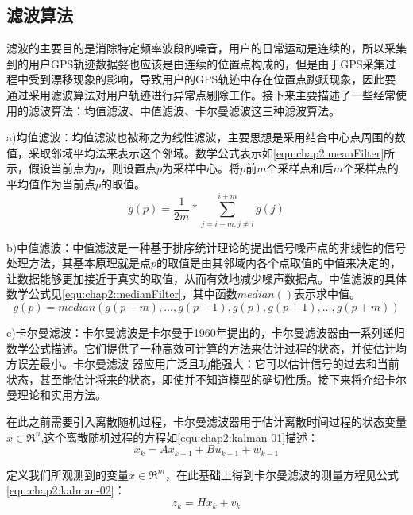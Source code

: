 \subsection{滤波算法}
\label{sec:section2-1-1}
滤波的主要目的是消除特定频率波段的噪音，用户的日常运动是连续的，所以采集到的用户GPS轨迹数据㛑也应该是由连续的位置点构成的，但是由于GPS采集过程中受到漂移现象的影响，导致用户的GPS轨迹中存在位置点跳跃现象，因此要通过采用滤波算法对用户轨迹进行异常点剔除工作。接下来主要描述了一些经常使用的滤波算法：均值滤波、中值滤波、卡尔曼滤波这三种滤波算法。
\par a)均值滤波：均值滤波也被称之为线性滤波，主要思想是采用结合中心点周围的数值，采取邻域平均法来表示这个邻域。数学公式表示如\ref{equ:chap2:meanFilter}所示，假设当前点为$p$，则设置点$p$为采样中心。将$p$前$m$个采样点和后$m$个采样点的平均值作为当前点$p$的取值。
\begin{equation}
\label{equ:chap2:meanFilter}
g(p)=\frac{1}{2m} \ast \sum_{j=i-m,j\neq i}^{i+m}g(j)
\end{equation}
\par b)中值滤波：中值滤波是一种基于排序统计理论的提出信号噪声点的非线性的信号处理方法，其基本原理就是点$p$的取值是由其邻域内各个点取值的中值来决定的，让数据能够更加接近于真实的取值，从而有效地减少噪声数据点。中值滤波的具体数学公式见\ref{equ:chap2:medianFilter}，其中函数$median()$表示求中值。
\begin{equation}
\label{equ:chap2:medianFilter}
g(p)=median({g(p-m),...,g(p-1),g(p),g(p+1),...,g(p+m)})
\end{equation}
\par c)卡尔曼滤波：卡尔曼滤波是卡尔曼于1960年提出的，卡尔曼滤波器由一系列递归数学公式描述。它们提供了一种高效可计算的方法来估计过程的状态，并使估计均方误差最小。卡尔曼滤波
器应用广泛且功能强大：它可以估计信号的过去和当前状态，甚至能估计将来的状态，即使并不知道模型的确切性质。接下来将介绍卡尔曼理论和实用方法。
\par 在此之前需要引入离散随机过程，卡尔曼滤波器用于估计离散时间过程的状态变量$x\in \Re^{n}$,这个离散随机过程的方程如\ref{equ:chap2:kalman-01}描述：
\begin{equation}
\label{equ:chap2:kalman-01}
x_{k}=Ax_{k-1}+Bu_{k-1}+w_{k-1}
\end{equation}
\par 定义我们所观测到的变量$x\in \Re^{m}$，在此基础上得到卡尔曼滤波的测量方程见公式\ref{equ:chap2:kalman-02}：
\begin{equation}
\label{equ:chap2:kalman-02}
z_{k}=Hx_{k}+v_{k}
\end{equation}

